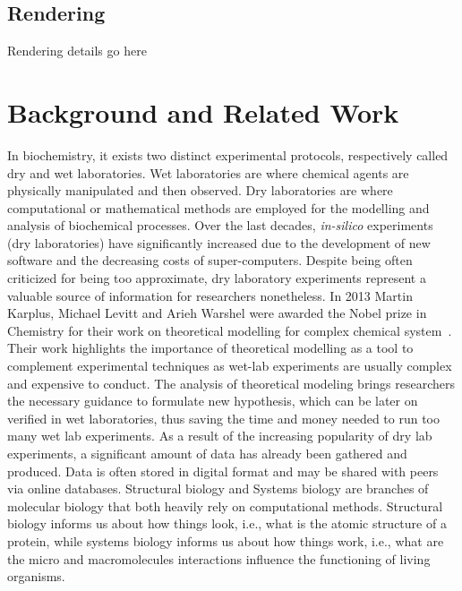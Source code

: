 \subsection{Rendering}

Rendering details go here





\section{Background and Related Work}

In biochemistry, it exists two distinct experimental protocols, respectively called dry and wet laboratories.
Wet laboratories are where chemical agents are physically manipulated and then observed.
Dry laboratories are where computational or mathematical methods are employed for the modelling and analysis of biochemical processes. 
Over the last decades, \textit{in-silico} experiments (dry laboratories) have significantly increased due to the development of new software and the decreasing costs of super-computers.
Despite being often criticized for being too approximate, dry laboratory experiments represent a valuable source of information for researchers nonetheless.
In 2013 Martin Karplus, Michael Levitt and Arieh Warshel were awarded the Nobel prize in Chemistry for their work on theoretical modelling for complex chemical system~\cite{karplus2014development}.
Their work highlights the importance of theoretical modelling as a tool to complement experimental techniques as wet-lab experiments are usually complex and expensive to conduct.
The analysis of theoretical modeling brings researchers the necessary guidance to formulate new hypothesis, which can be later on verified in wet laboratories, thus saving the time and money needed to run too many wet lab experiments.
As a result of the increasing popularity of dry lab experiments, a significant amount of data has already been gathered and produced.
Data is often stored in digital format and may be shared with peers via online databases.
Structural biology and Systems biology are branches of molecular biology that both heavily rely on computational methods.
Structural biology informs us about how things look, i.e., what is the atomic structure of a protein, while systems biology informs us about how things work, i.e., what are the micro and macromolecules interactions influence the functioning of living organisms.

